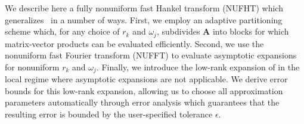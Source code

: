 We describe here a fully nonuniform fast Hankel transform (NUFHT) which
generalizes~\cite{townsend2015fast} in a number of ways. First, we employ an
adaptive partitioning scheme which, for any choice of $r_k$ and $\omega_j$,
subdivides $\bm{A}$ into blocks for which matrix-vector products can be
evaluated efficiently. Second, we use the nonuniform fast Fourier transform
(NUFFT) \citep{dutt1993fast, greengard2004accelerating} to evaluate asymptotic
expansions for nonuniform $r_k$ and $\omega_j$. Finally, we introduce the
low-rank expansion of \cite{wimp1962polynomial} in the local regime where
asymptotic expansions are not applicable. We derive error bounds for this
low-rank expansion, allowing us to choose all approximation parameters
automatically through error analysis which guarantees that the resulting error
is bounded by the user-specified tolerance $\epsilon$. 

